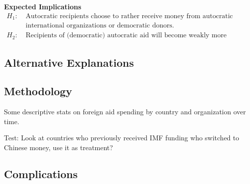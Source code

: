 \textbf{Expected Implications} 
\begin{align*}
    H_1:\; &\text{Autocratic recipients choose to rather receive money from autocratic donors than}\\
    &\text{international organizations or democratic donors.}\\
    H_2:\; &\text{Recipients of (democratic) autocratic aid will become weakly more (democratic) autocratic.}
\end{align*}

\subsection*{Alternative Explanations}

\subsection*{Methodology}
Some descriptive stats on foreign aid spending by country and organization over time. 

Test: Look at countries who previously received IMF funding who switched to Chinese money, use it as treatment?

\subsection*{Complications}
